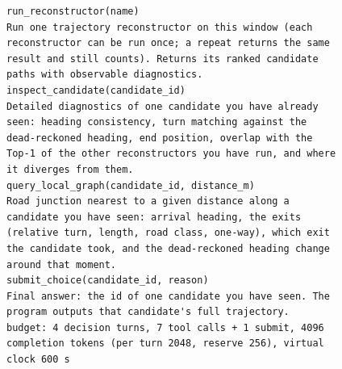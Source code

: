 \begin{scriptsize}\begin{verbatim}
run_reconstructor(name)
Run one trajectory reconstructor on this window (each
reconstructor can be run once; a repeat returns the same
result and still counts). Returns its ranked candidate
paths with observable diagnostics.
inspect_candidate(candidate_id)
Detailed diagnostics of one candidate you have already
seen: heading consistency, turn matching against the
dead-reckoned heading, end position, overlap with the
Top-1 of the other reconstructors you have run, and where
it diverges from them.
query_local_graph(candidate_id, distance_m)
Road junction nearest to a given distance along a
candidate you have seen: arrival heading, the exits
(relative turn, length, road class, one-way), which exit
the candidate took, and the dead-reckoned heading change
around that moment.
submit_choice(candidate_id, reason)
Final answer: the id of one candidate you have seen. The
program outputs that candidate's full trajectory.
budget: 4 decision turns, 7 tool calls + 1 submit, 4096
completion tokens (per turn 2048, reserve 256), virtual
clock 600 s
\end{verbatim}\end{scriptsize}
